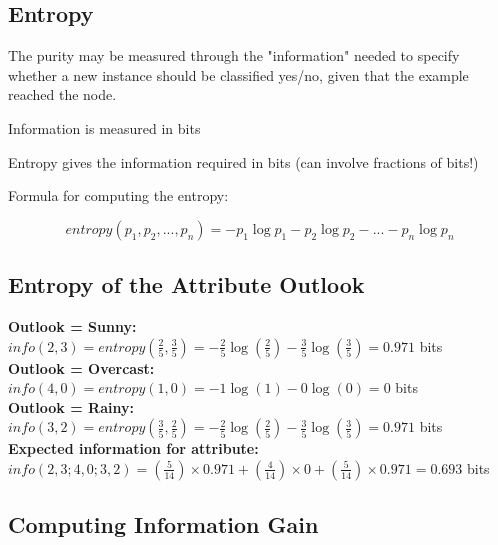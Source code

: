 \subsection{Entropy}

    The purity may be measured through the "information" needed to specify whether a new instance should be classified yes/no, given that the example reached the node.
    
    \begin{compactitemize}
        \item Information is measured in bits
        \item Entropy gives the information required in bits (can involve fractions of bits!)
        \item Formula for computing the entropy:
    \end{compactitemize}
    
    \begin{equation}
    entropy(p_1, p_2, ..., p_n) = -p_1\log p_1 - p_2\log p_2 - ... - p_n\log p_n
    \end{equation}


\subsection{Entropy of the Attribute Outlook}

    \textbf{Outlook = Sunny:}\\
    $info(2,3) = entropy(\frac{2}{5}, \frac{3}{5}) = -\frac{2}{5}\log(\frac{2}{5}) - \frac{3}{5}\log(\frac{3}{5}) = 0.971$ bits\\
    
    \textbf{Outlook = Overcast:}\\
    $info(4,0) = entropy(1,0) = -1\log(1) - 0\log(0) = 0$ bits\\
    
    \textbf{Outlook = Rainy:}\\
    $info(3,2) = entropy(\frac{3}{5}, \frac{2}{5}) = -\frac{2}{5}\log(\frac{2}{5}) - \frac{3}{5}\log(\frac{3}{5}) = 0.971$ bits\\
    
    \textbf{Expected information for attribute:}\\
    $info(2,3; 4,0; 3,2) = (\frac{5}{14}) \times 0.971 + (\frac{4}{14}) \times 0 + (\frac{5}{14}) \times 0.971 = 0.693$ bits


\subsection{Computing Information Gain}

